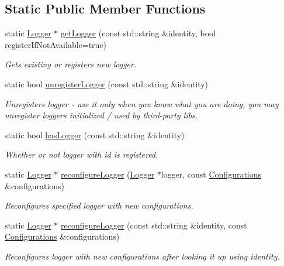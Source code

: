 \subsection*{Static Public Member Functions}
\begin{DoxyCompactItemize}
\item 
static \hyperlink{classel_1_1_logger}{Logger} $\ast$ \hyperlink{classel_1_1_loggers_aaebf868c558e3ba1d2e4f073a00f1d4a}{get\+Logger} (const std\+::string \&identity, bool register\+If\+Not\+Available=true)
\begin{DoxyCompactList}\small\item\em Gets existing or registers new logger. \end{DoxyCompactList}\item 
static bool \hyperlink{classel_1_1_loggers_a201d261ea57c070f07f0bf2006158587}{unregister\+Logger} (const std\+::string \&identity)
\begin{DoxyCompactList}\small\item\em Unregisters logger -\/ use it only when you know what you are doing, you may unregister loggers initialized / used by third-\/party libs. \end{DoxyCompactList}\item 
static bool \hyperlink{classel_1_1_loggers_a2d7a056cb7d9da3d96c709a2fac5c2bb}{has\+Logger} (const std\+::string \&identity)
\begin{DoxyCompactList}\small\item\em Whether or not logger with id is registered. \end{DoxyCompactList}\item 
static \hyperlink{classel_1_1_logger}{Logger} $\ast$ \hyperlink{classel_1_1_loggers_a888aca5bdccccc322da2eed430909d04}{reconfigure\+Logger} (\hyperlink{classel_1_1_logger}{Logger} $\ast$logger, const \hyperlink{classel_1_1_configurations}{Configurations} \&configurations)
\begin{DoxyCompactList}\small\item\em Reconfigures specified logger with new configurations. \end{DoxyCompactList}\item 
static \hyperlink{classel_1_1_logger}{Logger} $\ast$ \hyperlink{classel_1_1_loggers_a105f776fe19cb7fa2fccd2993d9f7a7c}{reconfigure\+Logger} (const std\+::string \&identity, const \hyperlink{classel_1_1_configurations}{Configurations} \&configurations)
\begin{DoxyCompactList}\small\item\em Reconfigures logger with new configurations after looking it up using identity. \end{DoxyCompactList}\item 

\end{DoxyCompactItemize}
